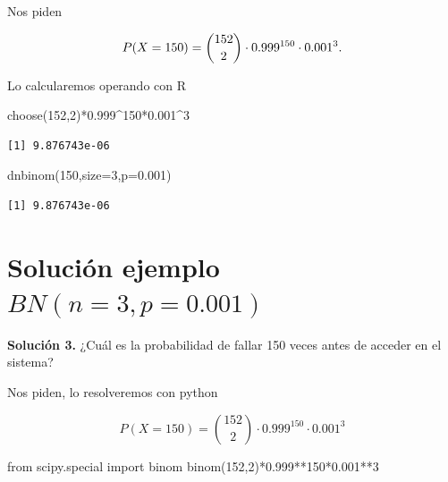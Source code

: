 \documentclass[
  letterpaper,
  DIV=11,
  numbers=noendperiod]{scrreprt}
\newenvironment{Shaded}{\begin{snugshade}}{\end{snugshade}}
\newcommand{\AttributeTok}[1]{\textcolor[rgb]{0.40,0.45,0.13}{#1}}
\newcommand{\DecValTok}[1]{\textcolor[rgb]{0.68,0.00,0.00}{#1}}
\newcommand{\FloatTok}[1]{\textcolor[rgb]{0.68,0.00,0.00}{#1}}
\newcommand{\FunctionTok}[1]{\textcolor[rgb]{0.28,0.35,0.67}{#1}}
\newcommand{\ImportTok}[1]{\textcolor[rgb]{0.00,0.46,0.62}{#1}}
\newcommand{\NormalTok}[1]{\textcolor[rgb]{0.00,0.23,0.31}{#1}}
\newcommand{\OperatorTok}[1]{\textcolor[rgb]{0.37,0.37,0.37}{#1}}
\newcommand{\SpecialCharTok}[1]{\textcolor[rgb]{0.37,0.37,0.37}{#1}}
\begin{document}
Nos piden

\[
\scriptsize{P(X=150)= {152\choose 2} \cdot 0.999^{150}\cdot 0.001^3.}
\]

Lo calcularemos operando con R

\begin{Shaded}
\begin{Highlighting}[]
\FunctionTok{choose}\NormalTok{(}\DecValTok{152}\NormalTok{,}\DecValTok{2}\NormalTok{)}\SpecialCharTok{*}\FloatTok{0.999}\SpecialCharTok{\^{}}\DecValTok{150}\SpecialCharTok{*}\FloatTok{0.001}\SpecialCharTok{\^{}}\DecValTok{3}
\end{Highlighting}
\end{Shaded}

\begin{verbatim}
[1] 9.876743e-06
\end{verbatim}

\begin{Shaded}
\begin{Highlighting}[]
\FunctionTok{dnbinom}\NormalTok{(}\DecValTok{150}\NormalTok{,}\AttributeTok{size=}\DecValTok{3}\NormalTok{,}\AttributeTok{p=}\FloatTok{0.001}\NormalTok{)}
\end{Highlighting}
\end{Shaded}

\begin{verbatim}
[1] 9.876743e-06
\end{verbatim}

\section{\texorpdfstring{Solución ejemplo
\(BN(n=3,p=0.001)\)}{Solución ejemplo BN(n=3,p=0.001)}}\label{soluciuxf3n-ejemplo-bnn3p0.001-1}

\textbf{Solución 3.} ¿Cuál es la probabilidad de fallar 150 veces antes
de acceder en el sistema?

Nos piden, lo resolveremos con python

\[
P(X=150)= {152\choose 2} \cdot 0.999^{150}\cdot 0.001^3
\]

\begin{Shaded}
\begin{Highlighting}[]
\ImportTok{from}\NormalTok{  scipy.special }\ImportTok{import}\NormalTok{ binom}
\NormalTok{binom(}\DecValTok{152}\NormalTok{,}\DecValTok{2}\NormalTok{)}\OperatorTok{*}\FloatTok{0.999}\OperatorTok{**}\DecValTok{150}\OperatorTok{*}\FloatTok{0.001}\OperatorTok{**}\DecValTok{3}
\end{Highlighting}
\end{Shaded}
\end{document}
